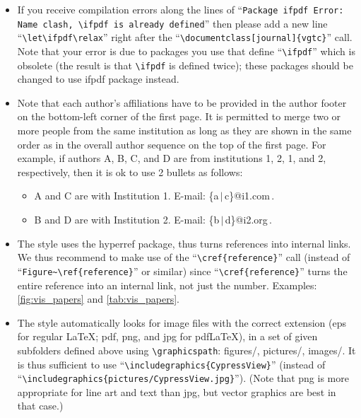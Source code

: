 \documentclass[journal]{vgtc}                %
\begin{document}
\begin{itemize}
	\item If you receive compilation errors along the lines of ``\texttt{Package ifpdf Error: Name clash, \textbackslash ifpdf is already defined}'' then please add a new line ``\texttt{\textbackslash let\textbackslash ifpdf\textbackslash relax}'' right after the ``\texttt{\textbackslash documentclass[journal]\{vgtc\}}'' call.	
		Note that your error is due to packages you use that define ``\texttt{\textbackslash ifpdf}'' which is obsolete (the result is that \texttt{\textbackslash ifpdf} is defined twice); these packages should be changed to use ifpdf package instead.
	
	\item Note that each author's affiliations have to be provided in the author footer on the bottom-left corner of the first page.
		It is permitted to merge two or more people from the same institution as long as they are shown in the same order as in the overall author sequence on the top of the first page.
		For example, if authors A, B, C, and D are from institutions 1, 2, 1, and 2, respectively, then it is ok to use 2 bullets as follows:
		\begin{itemize}		
			\item A and C are with Institution 1. E-mail: \{a\,$|$\,c\}@i1.com\,.
			
			\item B and D are with Institution 2. E-mail: \{b\,$|$\,d\}@i2.org\,.
		\end{itemize}
	
	\item The style uses the hyperref package, thus turns references into internal links.
		We thus recommend to make use of the ``\texttt{\textbackslash cref\{reference\}}'' call (instead of ``\texttt{Figure\~{}\textbackslash ref\{reference\}}'' or similar) since ``\texttt{\textbackslash cref\{reference\}}'' turns the entire reference into an internal link, not just the number.
		Examples: \cref{fig:vis_papers} and \cref{tab:vis_papers}.
	
	\item The style automatically looks for image files with the correct extension (eps for regular \LaTeX; pdf, png, and jpg for pdf\LaTeX), in a set of given subfolders defined above using \texttt{\textbackslash graphicspath}: figures/, pictures/, images/.
		It is thus sufficient to use ``\texttt{\textbackslash includegraphics\{CypressView\}}'' (instead of ``\texttt{\textbackslash includegraphics\{pictures/CypressView.jpg\}}'').
		(Note that png is more appropriate for line art and text than jpg, but vector graphics are best in that case.)
	

\end{itemize}
\end{document}
